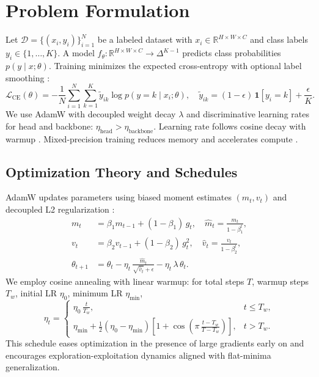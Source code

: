 \documentclass[11pt,a4paper]{article}
\begin{document}
\section{Problem Formulation}
Let \(\mathcal{D}=\{(x_i,y_i)\}_{i=1}^N\) be a labeled dataset with \(x_i\in\mathbb{R}^{H\times W\times C}\) and class labels \(y_i\in\{1,\dots,K\}\). A model \(f_\theta: \mathbb{R}^{H\times W\times C}\to\Delta^{K-1}\) predicts class probabilities \(p(y\mid x;\theta)\). Training minimizes the expected cross-entropy with optional label smoothing \cite{szegedy2016rethinking}:
\begin{equation}
\mathcal{L}_{\text{CE}}(\theta) = - \frac{1}{N}\sum_{i=1}^N \sum_{k=1}^K \tilde{y}_{ik} \log p(y=k\mid x_i;\theta), \quad \tilde{y}_{ik}=(1-\epsilon)\,\mathbf{1}[y_i=k] + \frac{\epsilon}{K}.
\end{equation}
We use AdamW \cite{loshchilov2017decoupled} with decoupled weight decay \(\lambda\) and discriminative learning rates for head and backbone: \(\eta_{\text{head}}>\eta_{\text{backbone}}\). Learning rate follows cosine decay with warmup \cite{loshchilov2017sgdr}. Mixed-precision training reduces memory and accelerates compute \cite{micikevicius2018mixedprecision}.

\subsection{Optimization Theory and Schedules}
AdamW updates parameters using biased moment estimates \((m_t, v_t)\) and decoupled L2 regularization \cite{loshchilov2017decoupled}:
\begin{align}
 m_t &= \beta_1 m_{t-1} + (1{-}\beta_1)\,g_t, \quad \hat m_t = \frac{m_t}{1-\beta_1^t}, \\
 v_t &= \beta_2 v_{t-1} + (1{-}\beta_2)\,g_t^2, \quad \hat v_t = \frac{v_t}{1-\beta_2^t}, \\
 \theta_{t+1} &= \theta_t - \eta_t\,\frac{\hat m_t}{\sqrt{\hat v_t}+\epsilon} - \eta_t\,\lambda\,\theta_t.
\end{align}
We employ cosine annealing with linear warmup: for total steps \(T\), warmup steps \(T_w\), initial LR \(\eta_0\), minimum LR \(\eta_{\min}\),
\begin{equation}
 \eta_t = \begin{cases}
  \eta_0\,\frac{t}{T_w}, & t \le T_w,\\
  \eta_{\min} + \tfrac{1}{2}(\eta_0{-}\eta_{\min})\left[1+\cos\left(\pi\,\frac{t-T_w}{T-T_w}\right)\right], & t>T_w.
 \end{cases}
\end{equation}
This schedule eases optimization in the presence of large gradients early on and encourages exploration-exploitation dynamics aligned with flat-minima generalization.
\end{document}
